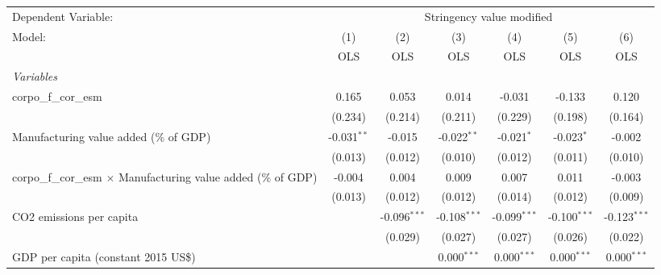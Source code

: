 
\begingroup
\centering
\begin{tabular}{lcccccc}
   \toprule
   Dependent Variable: & \multicolumn{6}{c}{Stringency value modified}\\
   Model:                                                                 & (1)           & (2)            & (3)            & (4)            & (5)            & (6)\\  
                                                                          &  OLS          & OLS            & OLS            & OLS            & OLS            & OLS\\  
   \midrule
   \emph{Variables}\\
   corpo\_f\_cor\_esm                                                     & 0.165         & 0.053          & 0.014          & -0.031         & -0.133         & 0.120\\   
                                                                          & (0.234)       & (0.214)        & (0.211)        & (0.229)        & (0.198)        & (0.164)\\   
   Manufacturing value added (\% of GDP)                                  & -0.031$^{**}$ & -0.015         & -0.022$^{**}$  & -0.021$^{*}$   & -0.023$^{*}$   & -0.002\\   
                                                                          & (0.013)       & (0.012)        & (0.010)        & (0.012)        & (0.011)        & (0.010)\\   
   corpo\_f\_cor\_esm $\times$ Manufacturing value added (\% of GDP)      & -0.004        & 0.004          & 0.009          & 0.007          & 0.011          & -0.003\\   
                                                                          & (0.013)       & (0.012)        & (0.012)        & (0.014)        & (0.012)        & (0.009)\\   
   CO2 emissions per capita                                               &               & -0.096$^{***}$ & -0.108$^{***}$ & -0.099$^{***}$ & -0.100$^{***}$ & -0.123$^{***}$\\   
                                                                          &               & (0.029)        & (0.027)        & (0.027)        & (0.026)        & (0.022)\\   
   GDP per capita (constant 2015 US\$)                                    &               &                & 0.000$^{***}$  & 0.000$^{***}$  & 0.000$^{***}$  & 0.000$^{***}$\\   

\end{tabular}
